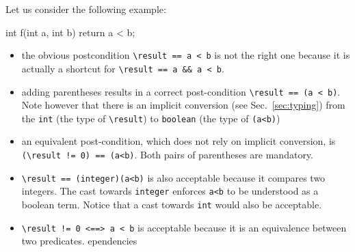 Let us consider the following example:
\begin{listing-nonumber}
  int f(int a, int b) { return a < b; }
\end{listing-nonumber}
\begin{itemize}
\item the obvious postcondition \lstinline[style=c]|\result == a < b|
  is not the right one because it is actually a shortcut for
  \lstinline[style=c]|\result == a && a < b|.
\item adding parentheses results in a correct post-condition
  \lstinline[style=c]|\result == (a < b)|. 
Note however that there is an implicit
  conversion (see Sec.~\ref{sec:typing})
  from the \lstinline[style=c]|int| (the type of \lstinline[style=c]|\result|) to
  \lstinline[style=c]|boolean| (the type of \lstinline[style=c]|(a<b)|)
\item an equivalent post-condition, which does not rely on implicit
  conversion, is \lstinline[style=c]|(\result != 0) == (a<b)|. Both pairs of
  parentheses are mandatory.
\item \lstinline[style=c]|\result == (integer)(a<b)| is also acceptable because it compares
  two integers. The cast towards \lstinline[style=c]|integer| enforces
  \lstinline[style=c]|a<b| to be understood as a boolean term. Notice that a cast
  towards \lstinline[style=c]|int| would also be acceptable.
\item \lstinline[style=c]|\result != 0 <==> a < b| is acceptable because it is an
  equivalence between two predicates.
ependencies
\end{itemize}
